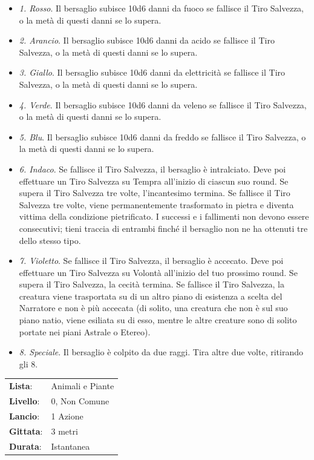 \begin{multicols}{2}
\begin{itemize}[leftmargin=*] \setlength{\itemsep}{0pt}
	\item \emph{1. Rosso}. Il bersaglio subisce 10d6 danni da fuoco se fallisce il Tiro Salvezza, o la metà di questi danni se lo supera.
	\item \emph{2. Arancio}. Il bersaglio subisce 10d6 danni da acido se fallisce il Tiro Salvezza, o la metà di questi danni se lo supera.
	\item \emph{3. Giallo}. Il bersaglio subisce 10d6 danni da elettricità se fallisce il Tiro Salvezza, o la metà di questi danni se lo supera.
	\item \emph{4. Verde}. Il bersaglio subisce 10d6 danni da veleno se fallisce il Tiro Salvezza, o la metà di questi danni se lo supera.
	\item \emph{5. Blu}. Il bersaglio subisce 10d6 danni da freddo se fallisce il Tiro Salvezza, o la metà di questi danni se lo supera.
	\item \emph{6. Indaco}. Se fallisce il Tiro Salvezza, il bersaglio è intralciato. Deve poi effettuare un Tiro Salvezza su Tempra all'inizio di ciascun suo round. Se supera il Tiro Salvezza tre volte, l'incantesimo termina. Se fallisce il Tiro Salvezza tre volte, viene permanentemente trasformato in pietra e diventa vittima della condizione pietrificato. I successi e i fallimenti non devono essere consecutivi; tieni traccia di entrambi finché il bersaglio non ne ha ottenuti tre dello stesso tipo.
	\item \emph{7. Violetto}. Se fallisce il Tiro Salvezza, il bersaglio è accecato. Deve poi effettuare un Tiro Salvezza su Volontà all'inizio del tuo prossimo round. Se supera il Tiro Salvezza, la cecità termina. Se fallisce il Tiro Salvezza, la creatura viene trasportata su di un altro piano di esistenza a scelta del Narratore e non è più accecata (di solito, una creatura che non è sul suo piano natio, viene esiliata su di esso, mentre le altre creature sono di solito portate nei piani Astrale o Etereo).
	\item \emph{8. Speciale}. Il bersaglio è colpito da due raggi. Tira altre due volte, ritirando gli 8.

\end{itemize}

\noindent\begin{tabularx}{\linewidth}{p{1.3cm}X}
	\rowcolor{gray!20}\textbf{Lista}: & Animali e Piante \\
	\textbf{Livello}: & 0, Non Comune \\
	\rowcolor{gray!20}\textbf{Lancio}: & 1 Azione \\
	\textbf{Gittata}: & 3 metri \\
	\rowcolor{gray!20}\textbf{Durata}: & Istantanea \\
\end{tabularx}\smallskip


\end{multicols}

